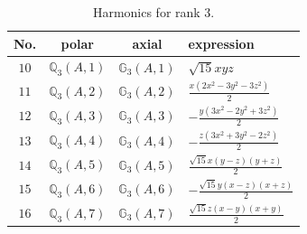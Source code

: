 \documentclass[fleqn,8pt,landscape]{jsarticle}
\begin{document}
\begin{table}[ht!]
\begin{center}
\caption{Harmonics for rank 3.}
\renewcommand{\arraystretch}{1.3}
\begin{tabular}{cccl} \hline \hline
No. & polar & axial & expression \\ \hline
$ 10 $ & $ \mathbb{Q}_{3}(A,1) $ & $ \mathbb{G}_{3}(A,1) $ & $ \sqrt{15} x y z $ \\
$ 11 $ & $ \mathbb{Q}_{3}(A,2) $ & $ \mathbb{G}_{3}(A,2) $ & $ \frac{x \left(2 x^{2} - 3 y^{2} - 3 z^{2}\right)}{2} $ \\
$ 12 $ & $ \mathbb{Q}_{3}(A,3) $ & $ \mathbb{G}_{3}(A,3) $ & $ - \frac{y \left(3 x^{2} - 2 y^{2} + 3 z^{2}\right)}{2} $ \\
$ 13 $ & $ \mathbb{Q}_{3}(A,4) $ & $ \mathbb{G}_{3}(A,4) $ & $ - \frac{z \left(3 x^{2} + 3 y^{2} - 2 z^{2}\right)}{2} $ \\
$ 14 $ & $ \mathbb{Q}_{3}(A,5) $ & $ \mathbb{G}_{3}(A,5) $ & $ \frac{\sqrt{15} x \left(y - z\right) \left(y + z\right)}{2} $ \\
$ 15 $ & $ \mathbb{Q}_{3}(A,6) $ & $ \mathbb{G}_{3}(A,6) $ & $ - \frac{\sqrt{15} y \left(x - z\right) \left(x + z\right)}{2} $ \\
$ 16 $ & $ \mathbb{Q}_{3}(A,7) $ & $ \mathbb{G}_{3}(A,7) $ & $ \frac{\sqrt{15} z \left(x - y\right) \left(x + y\right)}{2} $ \\
 \hline \hline
\end{tabular}
\end{center}
\end{table}
\end{document}
